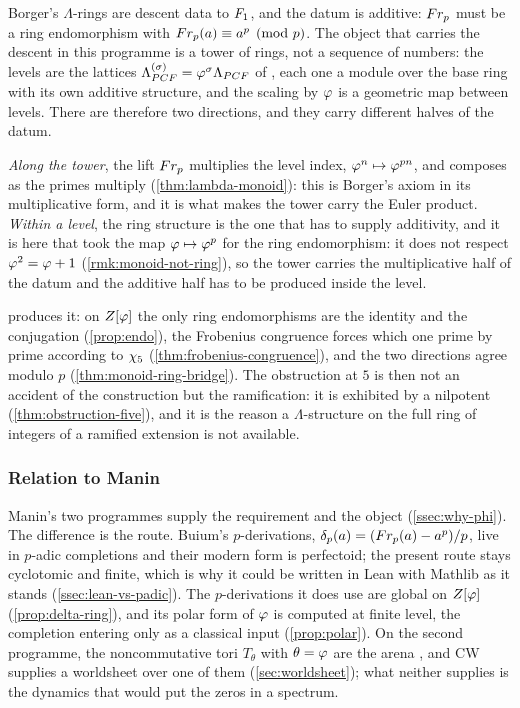 Borger's $\Lambda$-rings are descent data to $F_1$, and the datum is additive:
$Fr_p$ must be a ring endomorphism with $Fr_p(a)\equiv a^p\pmod p$.  The
object that carries the descent in this programme is a tower of rings, not a
sequence of numbers: the levels are the lattices $\Lambda_{PCF}^{(\sigma)}=\varphi^\sigma\Lambda_{PCF}$ of
\cite[\S2.8, \S3.4]{gonzalez26cw}, each one a module over the base ring with its
own additive structure, and the scaling by $\varphi$ is a geometric map between
levels.  There are therefore two directions, and they carry different halves of
the datum.

\emph{Along the tower}, the lift $Fr_p$ multiplies the level index,
$\varphi^n\mapsto\varphi^{pn}$, and composes as the primes multiply
(\cref{thm:lambda-monoid}): this is Borger's axiom in its multiplicative form,
and it is what makes the tower carry the Euler product.  \emph{Within a level},
the ring structure is the one that has to supply additivity, and it is here that
\cite{gonzalez25hp} took the map $\varphi\mapsto\varphi^p$ for the ring endomorphism: it does not respect
$\varphi^2=\varphi+1$ (\cref{rmk:monoid-not-ring}), so the tower carries the multiplicative half of the
datum and the additive half has to be produced inside the level.

 produces it: on $Z[\varphi]$ the only ring endomorphisms are
the identity and the conjugation (\cref{prop:endo}), the Frobenius congruence
forces which one prime by prime according to $\chi_5$
(\cref{thm:frobenius-congruence}), and the two directions agree modulo $p$
(\cref{thm:monoid-ring-bridge}).  The obstruction at $5$ is then not an accident
of the construction but the ramification: it is exhibited by a nilpotent
(\cref{thm:obstruction-five}), and it is the reason a $\Lambda$-structure on the
full ring of integers of a ramified extension is not available.

\subsubsection{Relation to Manin}\label{ssec:rel-manin}

Manin's two programmes supply the requirement and the object
(\cref{ssec:why-phi}).  The difference is the route.  Buium's $p$-derivations,
$\delta_p(a)=(Fr_p(a)-a^p)/p$, live in $p$-adic completions and their modern form is perfectoid; the present route stays cyclotomic and finite, which is why it could be written in Lean with Mathlib as it stands (\cref{ssec:lean-vs-padic}).  The $p$-derivations it does use are global on $Z[\varphi]$ (\cref{prop:delta-ring}), and its polar form of $\varphi$ is computed at finite level, the completion entering only as a classical input (\cref{prop:polar}).  On the second programme, the noncommutative tori
$T_\theta$ with $\theta=\varphi$ are the arena \cite{manin04}, and CW supplies a
worldsheet over one of them (\cref{sec:worldsheet}); what neither supplies is the
dynamics that would put the zeros in a spectrum.

